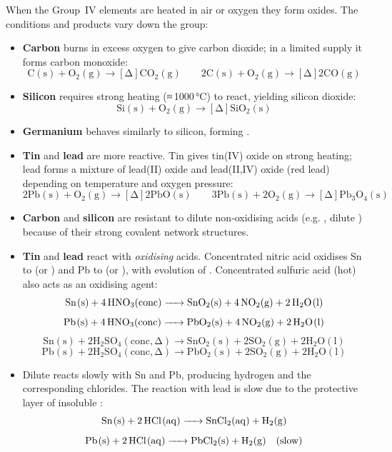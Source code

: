 \documentclass[11pt]{article}
\begin{document}
\begin{experience}
When the Group~IV elements are heated in air or oxygen they form oxides. The conditions and products vary down the group:
\begin{itemize}
\item \textbf{Carbon} burns in excess oxygen to give carbon dioxide; in a limited supply it forms carbon monoxide:
\[
\ensuremath{\mathrm{C(s) + O_{2}(g) \rightarrow [\Delta] CO_{2}(g)}} \qquad
\ensuremath{\mathrm{2C(s) + O_{2}(g) \rightarrow [\Delta] 2CO(g)}}
\]
\item \textbf{Silicon} requires strong heating (≈ 1000 °C) to react, yielding silicon dioxide:
\[
\ensuremath{\mathrm{Si(s) + O_{2}(g) \rightarrow [\Delta] SiO_{2}(s)}}
\]
\item \textbf{Germanium} behaves similarly to silicon, forming .
\item \textbf{Tin} and \textbf{lead} are more reactive. Tin gives tin(IV) oxide  on strong heating; lead forms a mixture of lead(II) oxide  and lead(II,IV) oxide  (red lead) depending on temperature and oxygen pressure:
\[
\ensuremath{\mathrm{2Pb(s) + O_{2}(g) \rightarrow [\Delta] 2PbO(s)}} \qquad
\ensuremath{\mathrm{3Pb(s) + 2O_{2}(g) \rightarrow [\Delta] Pb_{3}O_{4}(s)}}
\]
\end{itemize}
\end{experience}

\begin{experience}
\begin{itemize}
\item \textbf{Carbon} and \textbf{silicon} are resistant to dilute non‑oxidising acids (e.g. , dilute ) because of their strong covalent network structures.
\item \textbf{Tin} and \textbf{lead} react with \emph{oxidising} acids. Concentrated nitric acid oxidises Sn to  (or ) and Pb to  (or ), with evolution of . Concentrated sulfuric acid (hot) also acts as an oxidising agent:
\[
\ce{Sn(s) + 4HNO3(conc) -> SnO2(s) + 4NO2(g) + 2H2O(l)}
\]
\[
\ce{Pb(s) + 4HNO3(conc) -> PbO2(s) + 4NO2(g) + 2H2O(l)}
\]
\[
\ensuremath{\mathrm{Sn(s) + 2H_{2}SO_{4}(conc, \Delta) \rightarrow  SnO_{2}(s) + 2SO_{2}(g) + 2H_{2}O(l)}}
\]
\[
\ensuremath{\mathrm{Pb(s) + 2H_{2}SO_{4}(conc, \Delta) \rightarrow  PbO_{2}(s) + 2SO_{2}(g) + 2H_{2}O(l)}}
\]
\item Dilute  reacts slowly with Sn and Pb, producing hydrogen and the corresponding  chlorides. The reaction with lead is slow due to the protective layer of insoluble :
\[
\ce{Sn(s) + 2HCl(aq) -> SnCl2(aq) + H2(g)}
\]
\[
\ce{Pb(s) + 2HCl(aq) -> PbCl2(s) + H2(g)} \quad\text{(slow)}
\]
\end{itemize}
\end{experience}
\end{document}
